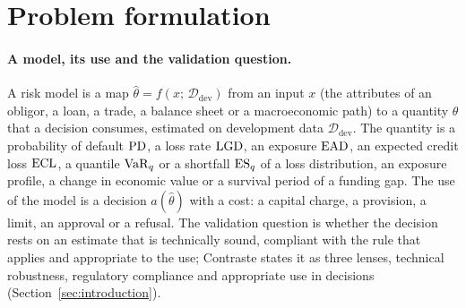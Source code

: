 \section{Problem formulation}
\label{sec:problem}

\paragraph{A model, its use and the validation question.} A risk model is a map $\hat\theta=f(x;\,\mathcal D_{\mathrm{dev}})$ from an input $x$ (the attributes of
an obligor, a loan, a trade, a balance sheet or a macroeconomic path) to a quantity $\theta$ that a decision consumes, estimated on development data
$\mathcal D_{\mathrm{dev}}$. The quantity is a probability of default $\mathrm{PD}$, a loss rate $\mathrm{LGD}$, an exposure $\mathrm{EAD}$, an expected credit loss $\mathrm{ECL}$, a
quantile $\operatorname{VaR}_q$ or a shortfall $\operatorname{ES}_q$ of a loss distribution, an exposure profile, a change in economic value or a survival period of a funding gap. The use
of the model is a decision $a(\hat\theta)$ with a cost: a capital charge, a provision, a limit, an approval or a refusal. The validation question is whether the
decision rests on an estimate that is technically sound, compliant with the rule that applies and appropriate to the use; Contraste states it as three lenses,
technical robustness, regulatory compliance and appropriate use in decisions (Section~\ref{sec:introduction}).

